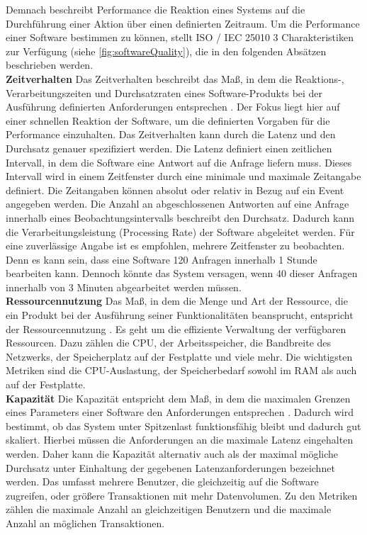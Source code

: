 \noindent
Demnach beschreibt Performance die Reaktion eines Systems auf die Durchführung einer Aktion über einen definierten Zeitraum. Um die Performance einer Software bestimmen zu können, stellt ISO / IEC 25010 3 Charakteristiken zur Verfügung (siehe \autoref{fig:softwareQuality}), die in den folgenden Absätzen beschrieben werden.\\

\noindent
\textbf{Zeitverhalten}\newline
Das Zeitverhalten beschreibt das Maß, in dem die Reaktions-, Verarbeitungszeiten und Durchsatzraten eines Software-Produkts bei der Ausführung definierten Anforderungen entsprechen \cite{ISOIEC.}. Der Fokus liegt hier auf einer schnellen Reaktion der Software, um die definierten Vorgaben für die Performance einzuhalten. Das Zeitverhalten kann durch die Latenz und den Durchsatz genauer spezifiziert werden. Die Latenz definiert einen zeitlichen Intervall, in dem die Software eine Antwort auf die Anfrage liefern muss. Dieses Intervall wird in einem Zeitfenster durch eine minimale und maximale Zeitangabe definiert. Die Zeitangaben können absolut oder relativ in Bezug auf ein Event angegeben werden. Die Anzahl an abgeschlossenen Antworten auf eine Anfrage innerhalb eines Beobachtungsintervalls beschreibt den Durchsatz. Dadurch kann die Verarbeitungsleistung (Processing Rate) der Software abgeleitet werden. Für eine zuverlässige Angabe ist es empfohlen, mehrere Zeitfenster zu beobachten. Denn es kann sein, dass eine Software 120 Anfragen innerhalb 1 Stunde bearbeiten kann. Dennoch könnte das System versagen, wenn 40 dieser Anfragen innerhalb von 3 Minuten abgearbeitet werden müssen.\cite{Barbacci.1995}\\

\noindent
\textbf{Ressourcennutzung}\newline
Das Maß, in dem die Menge und Art der Ressource, die ein Produkt bei der Ausführung seiner Funktionalitäten beansprucht, entspricht der Ressourcennutzung \cite{ISOIEC.}. Es geht um die effiziente Verwaltung der verfügbaren Ressourcen. Dazu zählen die CPU, der Arbeitsspeicher, die Bandbreite des Netzwerks, der Speicherplatz auf der Festplatte und viele mehr. Die wichtigsten Metriken sind die CPU-Auslastung, der Speicherbedarf sowohl im RAM als auch auf der Festplatte.\cite{Barbacci.1995}\\

\noindent
\textbf{Kapazität}\newline
Die Kapazität entspricht dem Maß, in dem die maximalen Grenzen eines Parameters einer Software den Anforderungen entsprechen \cite{ISOIEC.}. Dadurch wird bestimmt, ob das System unter Spitzenlast funktionsfähig bleibt und dadurch gut skaliert. Hierbei müssen die Anforderungen an die maximale Latenz eingehalten werden. Daher kann die Kapazität alternativ auch als der maximal mögliche Durchsatz unter Einhaltung der gegebenen Latenzanforderungen bezeichnet werden. Das umfasst mehrere Benutzer, die gleichzeitig auf die Software zugreifen, oder größere Transaktionen mit mehr Datenvolumen. Zu den Metriken zählen die maximale Anzahl an gleichzeitigen Benutzern und die maximale Anzahl an möglichen Transaktionen.\cite{Barbacci.1995}